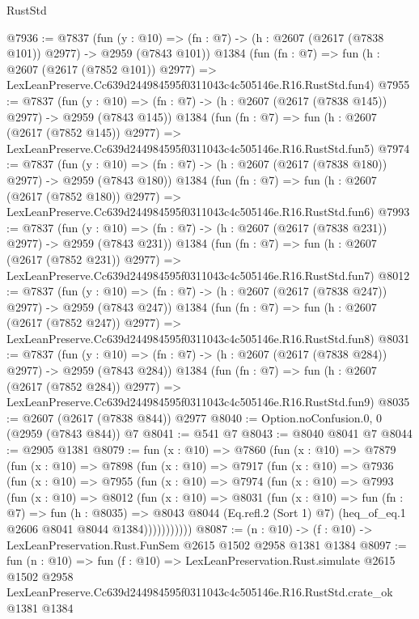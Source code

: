 \begin{lexlean}{RustStd}
\begin{coremodule}
@7936 := @7837
    (fun (y : @10) => (fn : @7) -> (h : @2607 (@2617 (@7838 @101)) @2977) -> @2959 (@7843 @101))
    @1384
    (fun (fn : @7) =>
    fun (h : @2607 (@2617 (@7852 @101)) @2977) =>
    LexLeanPreserve.Cc639d244984595f0311043c4c505146e.R16.RustStd.fun4)
@7955 := @7837
    (fun (y : @10) => (fn : @7) -> (h : @2607 (@2617 (@7838 @145)) @2977) -> @2959 (@7843 @145))
    @1384
    (fun (fn : @7) =>
    fun (h : @2607 (@2617 (@7852 @145)) @2977) =>
    LexLeanPreserve.Cc639d244984595f0311043c4c505146e.R16.RustStd.fun5)
@7974 := @7837
    (fun (y : @10) => (fn : @7) -> (h : @2607 (@2617 (@7838 @180)) @2977) -> @2959 (@7843 @180))
    @1384
    (fun (fn : @7) =>
    fun (h : @2607 (@2617 (@7852 @180)) @2977) =>
    LexLeanPreserve.Cc639d244984595f0311043c4c505146e.R16.RustStd.fun6)
@7993 := @7837
    (fun (y : @10) => (fn : @7) -> (h : @2607 (@2617 (@7838 @231)) @2977) -> @2959 (@7843 @231))
    @1384
    (fun (fn : @7) =>
    fun (h : @2607 (@2617 (@7852 @231)) @2977) =>
    LexLeanPreserve.Cc639d244984595f0311043c4c505146e.R16.RustStd.fun7)
@8012 := @7837
    (fun (y : @10) => (fn : @7) -> (h : @2607 (@2617 (@7838 @247)) @2977) -> @2959 (@7843 @247))
    @1384
    (fun (fn : @7) =>
    fun (h : @2607 (@2617 (@7852 @247)) @2977) =>
    LexLeanPreserve.Cc639d244984595f0311043c4c505146e.R16.RustStd.fun8)
@8031 := @7837
    (fun (y : @10) => (fn : @7) -> (h : @2607 (@2617 (@7838 @284)) @2977) -> @2959 (@7843 @284))
    @1384
    (fun (fn : @7) =>
    fun (h : @2607 (@2617 (@7852 @284)) @2977) =>
    LexLeanPreserve.Cc639d244984595f0311043c4c505146e.R16.RustStd.fun9)
@8035 := @2607 (@2617 (@7838 @844)) @2977
@8040 := Option.noConfusion.{0, 0} (@2959 (@7843 @844)) @7
@8041 := @541 @7
@8043 := @8040 @8041 @7
@8044 := @2905 @1381
@8079 := fun (x : @10) =>
  @7860
    (fun (x : @10) =>
    @7879
      (fun (x : @10) =>
      @7898
        (fun (x : @10) =>
        @7917
          (fun (x : @10) =>
          @7936
            (fun (x : @10) =>
            @7955
              (fun (x : @10) =>
              @7974
                (fun (x : @10) =>
                @7993
                  (fun (x : @10) =>
                  @8012
                    (fun (x : @10) =>
                    @8031
                      (fun (x : @10) =>
                      fun (fn : @7) =>
                      fun (h : @8035) =>
                      @8043
                        @8044
                        (Eq.refl.{2} (Sort 1) @7)
                        (heq_of_eq.{1} @2606 @8041 @8044 @1384)))))))))))
@8087 := (n : @10) -> (f : @10) -> LexLeanPreservation.Rust.FunSem @2615 @1502 @2958 @1381 @1384
@8097 := fun (n : @10) =>
  fun (f : @10) =>
  LexLeanPreservation.Rust.simulate
    @2615
    @1502
    @2958
    LexLeanPreserve.Cc639d244984595f0311043c4c505146e.R16.RustStd.crate_ok
    @1381
    @1384
\end{coremodule}
\end{lexlean}

